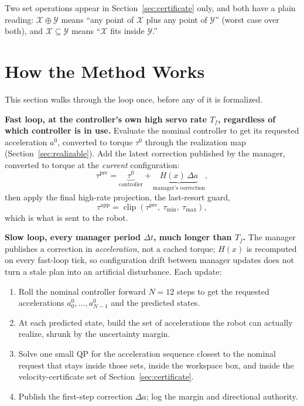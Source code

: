 \documentclass[journal]{IEEEtran}
\begin{document}
Two set operations appear in Section~\ref{sec:certificate} only, and both have a plain reading: $\mathcal X\oplus\mathcal Y$ means ``any point of $\mathcal X$ plus any point of $\mathcal Y$'' (worst case over both), and $\mathcal X\subseteq\mathcal Y$ means ``$\mathcal X$ fits inside $\mathcal Y$.''

\section{How the Method Works}
\label{sec:howitworks}

This section walks through the loop once, before any of it is formalized.

\textbf{Fast loop, at the controller's own high servo rate $T_f$, regardless of which controller is in use.} Evaluate the nominal controller to get its requested acceleration $a^0$, converted to torque $\tau^0$ through the realization map (Section~\ref{sec:realizable}). Add the latest correction published by the manager, converted to torque at the \emph{current} configuration:
\[
\tau^{\mathrm{pre}}=\underbrace{\tau^0}_{\text{controller}}+\underbrace{H(x)\,\Delta a}_{\text{manager's correction}},
\]
then apply the final high-rate projection, the last-resort guard,
\[
\tau^{\mathrm{app}}=\operatorname{clip}\left(\tau^{\mathrm{pre}},\ \tau_{\min},\ \tau_{\max}\right),
\]
which is what is sent to the robot.

\textbf{Slow loop, every manager period $\Delta t$, much longer than $T_f$.} The manager publishes a correction in \emph{acceleration}, not a cached torque; $H(x)$ is recomputed on every fast-loop tick, so configuration drift between manager updates does not turn a stale plan into an artificial disturbance. Each update:
\begin{enumerate}
\item Roll the nominal controller forward $N=12$ steps to get the requested accelerations $a^0_0,\dots,a^0_{N-1}$ and the predicted states.
\item At each predicted state, build the set of accelerations the robot can actually realize, shrunk by the uncertainty margin.
\item Solve one small QP for the acceleration sequence closest to the nominal request that stays inside those sets, inside the workspace box, and inside the velocity-certificate set of Section~\ref{sec:certificate}.
\item Publish the first-step correction $\Delta a$; log the margin and directional authority.
\end{enumerate}
\end{document}
